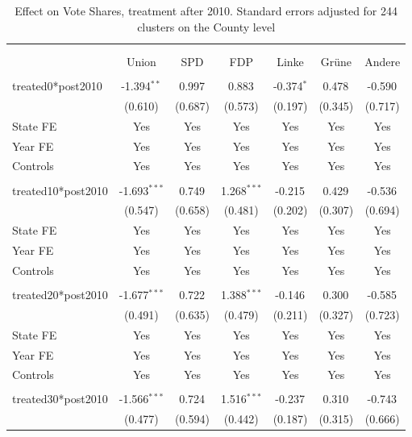\documentclass[12pt]{article}
\begin{document}
 
\begin{table}[!htbp] \centering
  \caption{Effect on Vote Shares, treatment after 2010. Standard errors adjusted for 244 clusters on the County level}
\begin{tabular}{@{\extracolsep{5pt}}lcccccc}
\\[-1.8ex]\hline
\hline \\[-1.8ex]
\\[-1.8ex] & \multicolumn{1}{c}{Union} & \multicolumn{1}{c}{SPD} & \multicolumn{1}{c}{FDP} & \multicolumn{1}{c}{Linke} & \multicolumn{1}{c}{Grüne} & \multicolumn{1}{c}{Andere}  \\
\hline \\[-1.8ex]
 treated0*post2010 & -1.394$^{**}$ & 0.997$^{}$ & 0.883$^{}$ & -0.374$^{*}$ & 0.478$^{}$ & -0.590$^{}$ \\
  & (0.610) & (0.687) & (0.573) & (0.197) & (0.345) & (0.717) \\
 State FE & Yes & Yes & Yes & Yes & Yes & Yes \\
 Year FE & Yes & Yes & Yes & Yes & Yes & Yes \\
 Controls & Yes & Yes & Yes & Yes & Yes & Yes \\
\hline \\[-1.8ex]
 treated10*post2010 & -1.693$^{***}$ & 0.749$^{}$ & 1.268$^{***}$ & -0.215$^{}$ & 0.429$^{}$ & -0.536$^{}$ \\
  & (0.547) & (0.658) & (0.481) & (0.202) & (0.307) & (0.694) \\
 State FE & Yes & Yes & Yes & Yes & Yes & Yes \\
 Year FE & Yes & Yes & Yes & Yes & Yes & Yes \\
 Controls & Yes & Yes & Yes & Yes & Yes & Yes \\
\hline \\[-1.8ex]
 treated20*post2010 & -1.677$^{***}$ & 0.722$^{}$ & 1.388$^{***}$ & -0.146$^{}$ & 0.300$^{}$ & -0.585$^{}$ \\
  & (0.491) & (0.635) & (0.479) & (0.211) & (0.327) & (0.723) \\
 State FE & Yes & Yes & Yes & Yes & Yes & Yes \\
 Year FE & Yes & Yes & Yes & Yes & Yes & Yes \\
 Controls & Yes & Yes & Yes & Yes & Yes & Yes \\
\hline \\[-1.8ex]
 treated30*post2010 & -1.566$^{***}$ & 0.724$^{}$ & 1.516$^{***}$ & -0.237$^{}$ & 0.310$^{}$ & -0.743$^{}$ \\
  & (0.477) & (0.594) & (0.442) & (0.187) & (0.315) & (0.666) \\

\end{tabular}
\end{table}
\end{document}
